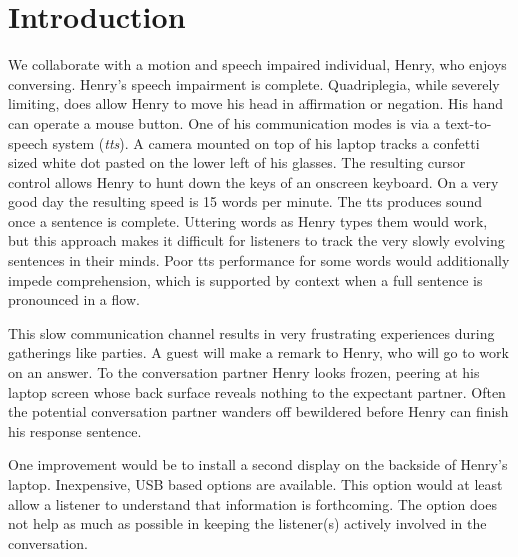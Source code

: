 \documentclass{sigchi}
\begin{document}
\section{Introduction}
We collaborate with a motion and speech impaired individual, Henry,
who enjoys conversing. Henry's speech impairment is
complete. Quadriplegia, while severely limiting, does allow Henry to
move his head in affirmation or negation. His hand can operate a mouse
button. One of his communication modes is via a text-to-speech system
({\em tts}). A camera mounted on top of his laptop tracks a confetti
sized white dot pasted on the lower left of his glasses. The resulting
cursor control allows Henry to hunt down the keys of an onscreen
keyboard. On a very good day the resulting speed is 15 words per
minute. The tts produces sound once a sentence is complete. Uttering
words as Henry types them would work, but this approach makes it
difficult for listeners to track the very slowly evolving sentences in
their minds. Poor tts performance for some words would additionally
impede comprehension, which is supported by context when a full
sentence is pronounced in a flow.

This slow communication channel results in very frustrating
experiences during gatherings like parties. A guest will make a remark
to Henry, who will go to work on an answer. To the conversation
partner Henry looks frozen, peering at his laptop screen whose back
surface reveals nothing to the expectant partner. Often the potential
conversation partner wanders off bewildered before Henry can finish
his response sentence.

One improvement would be to install a second display on the backside
of Henry's laptop. Inexpensive, USB based options are available. This
option would at least allow a listener to understand that information
is forthcoming. The option does not help as much as possible in
keeping the listener(s) actively involved in the conversation. 
\end{document}
